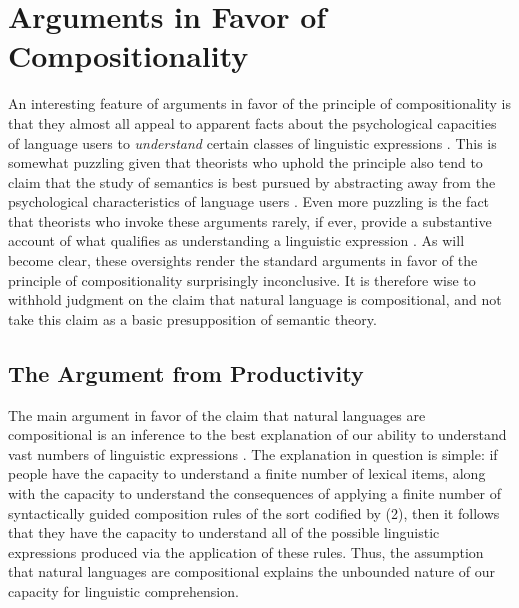 \section{Arguments in Favor of Compositionality}

An interesting feature of arguments in favor of the principle of compositionality is that they almost all appeal to apparent facts about the psychological capacities of language users to \textit{understand} certain classes of linguistic expressions \citep{Szabo:2013}. This is somewhat puzzling given that theorists who uphold the principle also tend to claim that the study of semantics is best pursued by abstracting away from the psychological characteristics of language users \citep[e.g.,][]{Speaks:2014,Lewis:1970,Lewis:1975,Carpenter:1997}. Even more puzzling is the fact that theorists who invoke these arguments rarely, if ever, provide a substantive account of what qualifies as understanding a linguistic expression \citep{Szabo:2013}. As will become clear, these oversights render the standard arguments in favor of the principle of compositionality surprisingly inconclusive. It is therefore wise to withhold judgment on the claim that natural language is compositional, and not take this claim as a basic presupposition of semantic theory.

\subsection{The Argument from Productivity}

The main argument in favor of the claim that natural languages are compositional is an inference to the best explanation of our ability to understand vast numbers of linguistic expressions \citep{FodorPylyshyn:1988}. The explanation in question is simple: if people have the capacity to understand a finite number of lexical items, along with the capacity to understand the consequences of applying a finite number of syntactically guided composition rules of the sort codified by (2), then it follows that they have the capacity to understand all of the possible linguistic expressions produced via the application of these rules. Thus, the assumption that natural languages are compositional explains the unbounded nature of our capacity for linguistic comprehension.

